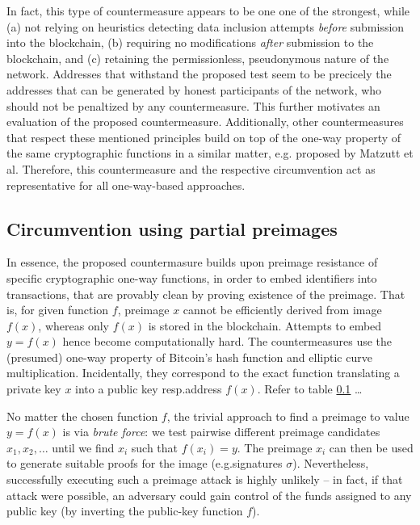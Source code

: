 \documentclass[10pt,a4paper,twocolumn]{article}
\begin{document}
In fact, this type of countermeasure appears to be one one of the strongest, while (a) not relying on heuristics detecting data inclusion attempts \emph{before} submission into the blockchain, (b) requiring no modifications \emph{after} submission to the blockchain, and (c) retaining the permissionless, pseudonymous nature of the network.
Addresses that withstand the proposed test seem to be precicely the addresses that can be generated by honest participants of the network, who should not be penaltized by any countermeasure.
This further motivates an evaluation of the proposed countermeasure.
Additionally, other countermeasures that respect these mentioned principles build on top of the one-way property of the same cryptographic functions in a similar matter, e.g.\@ {} proposed by Matzutt et al.
Therefore, this countermeasure and the respective circumvention act as representative for all one-way-based approaches.


\subsection{Circumvention using partial preimages}


In essence, the proposed countermasure builds upon preimage resistance of specific cryptographic one-way functions,
in order to embed identifiers into transactions, that are provably clean by proving existence of the preimage.
That is, for given function $f$, preimage $x$ cannot be efficiently derived from image $f(x)$, whereas only $f(x)$ is stored in the blockchain.
Attempts to embed $y=f(x)$ hence become computationally hard.
The countermeasures use the (presumed) one-way property of Bitcoin's hash function and elliptic curve multiplication.
Incidentally, they correspond to the exact function translating a private key $x$ into a public key resp.\@ address $f(x)$.
Refer to table \ref{} \dots %

No matter the chosen function $f$, the trivial approach to find a preimage to value $y=f(x)$ is via \emph{brute force}: we test pairwise different preimage candidates $x_1, x_2, \dots$ until we find $x_i$ such that $f(x_i)=y$.
The preimage $x_i$ can then be used to generate suitable proofs for the image (e.g.\@ signatures $\sigma$).
Nevertheless, successfully executing such a preimage attack is highly unlikely – in fact, if that attack were possible, an adversary could gain control of the funds assigned to any public key (by inverting the public-key function $f$).
\end{document}
